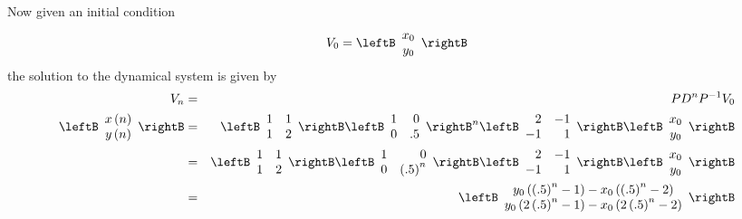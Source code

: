 \begin{solution}
Now given an initial condition
\begin{equation*}
V_0 = \leftB
\begin{array}{c}
x_{0} \\
y_{0}
\end{array}
\rightB
\end{equation*}
the solution to the dynamical system is given by 
\begin{eqnarray*}
V_n &=& P D^n P^{-1} V_0\\
\leftB
\begin{array}{c}
x\left( n\right) \\
y\left( n\right)
\end{array}
\rightB &=&\leftB
\begin{array}{rr}
1 & 1 \\
1 & 2
\end{array}
\rightB \leftB
\begin{array}{rr}
1 & 0 \\
0 & .5
\end{array}
\rightB ^{n}\leftB
\begin{array}{rr}
2 & -1 \\
-1 & 1
\end{array}
\rightB \leftB
\begin{array}{c}
x_{0} \\
y_{0}
\end{array}
\rightB \\
&=&\leftB
\begin{array}{rr}
1 & 1 \\
1 & 2
\end{array}
\rightB \leftB
\begin{array}{rr}
1 & 0 \\
0 & \left( .5\right) ^{n}
\end{array}
\rightB \leftB
\begin{array}{rr}
2 & -1 \\
-1 & 1
\end{array}
\rightB \leftB
\begin{array}{c}
x_{0} \\
y_{0}
\end{array}
\rightB \\
&=&\leftB
\begin{array}{c}
y_{0}\left( \left( .5\right) ^{n}-1\right) -x_{0}\left( \left( .5\right)
^{n}-2\right) \\
y_{0}\left( 2\left( .5\right) ^{n}-1\right) -x_{0}\left( 2\left( .5\right)
^{n}-2\right)
\end{array}
\rightB 
\end{eqnarray*}


\end{solution}
